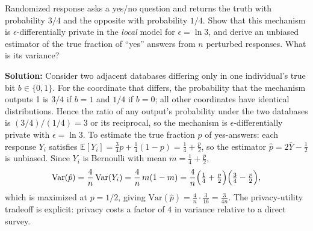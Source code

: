\begin{exercise}[Intermediate]
Randomized response asks a yes/no question and returns the truth with probability $3/4$ and the opposite with probability $1/4$. Show that this mechanism is $\epsilon$-differentially private in the \emph{local} model for $\epsilon = \ln 3$, and derive an unbiased estimator of the true fraction of ``yes'' answers from $n$ perturbed responses. What is its variance?
\end{exercise}
\textbf{Solution:} Consider two adjacent databases differing only in one individual's true bit $b \in \{0,1\}$. For the coordinate that differs, the probability that the mechanism outputs 1 is $3/4$ if $b=1$ and $1/4$ if $b=0$; all other coordinates have identical distributions. Hence the ratio of any output's probability under the two databases is $(3/4)/(1/4) = 3$ or its reciprocal, so the mechanism is $\epsilon$-differentially private with $\epsilon = \ln 3$. To estimate the true fraction $p$ of yes-answers: each response $Y_i$ satisfies $\mathbb{E}[Y_i] = \frac{3}{4}p + \frac{1}{4}(1-p) = \frac{1}{4} + \frac{p}{2}$, so the estimator $\hat{p} = 2\bar{Y} - \frac{1}{2}$ is unbiased. Since $Y_i$ is Bernoulli with mean $m = \frac{1}{4} + \frac{p}{2}$,
\[
\mathrm{Var}(\hat{p}) = \frac{4}{n}\,\mathrm{Var}(Y_i) = \frac{4}{n}\,m(1-m) = \frac{4}{n}\Bigl(\tfrac{1}{4}+\tfrac{p}{2}\Bigr)\Bigl(\tfrac{3}{4}-\tfrac{p}{2}\Bigr),
\]
which is maximized at $p = 1/2$, giving $\mathrm{Var}(\hat{p}) = \tfrac{4}{n} \cdot \tfrac{3}{16} = \tfrac{3}{4n}$. The privacy-utility tradeoff is explicit: privacy costs a factor of $4$ in variance relative to a direct survey.

